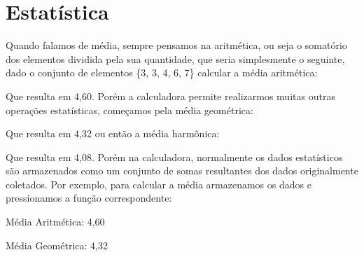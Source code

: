 \section*{Estatística}
Quando falamos de média, sempre pensamos na aritmética, ou seja o somatório dos elementos dividida pela sua quantidade, que seria simplesmente o seguinte, dado o conjunto de elementos \{3, 3, 4, 6, 7\} calcular a média aritmética:

  
 \keystroke{$+$} 
 \keystroke{$+$} 
 \keystroke{$+$} 
 \keystroke{$+$} 
 \keystroke{$\div$}

Que resulta em 4,60. Porém a calculadora permite realizarmos muitas outras operações estatísticas, começamos pela média geométrica:

  
 \keystroke{$\times$} 
 \keystroke{$\times$} 
 \keystroke{$\times$} 
 \keystroke{$\times$} 
  

Que resulta em 4,32 ou então a média harmônica:

  \keystroke{$+$} 
  \keystroke{$+$} 
  \keystroke{$+$} 
  \keystroke{$+$} 
  \keystroke{$+$} 
 \keystroke{$\div$} 

Que resulta em 4,08. Porém na calculadora, normalmente os dados estatísticos são armazenados como um conjunto de somas resultantes dos dados originalmente coletados. Por exemplo, para calcular a média armazenamos os dados e pressionamos a função correspondente:

Média Aritmética: 4,60 \\
 \keystroke{$\sum$}   \keystroke{$\sum+$}  \keystroke{$\sum+$}  \keystroke{$\sum+$}  \keystroke{$\sum+$}  \keystroke{$\sum+$}  

Média Geométrica: 4,32 \\
 \keystroke{$\sum$} 
   \keystroke{$\sum+$} 
   \keystroke{$\sum+$} 
   \keystroke{$\sum+$} 
   \keystroke{$\sum+$} 
   \keystroke{$\sum+$} 
   

